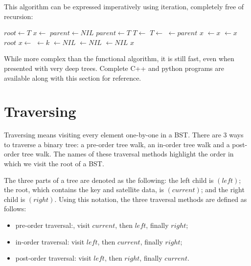 \documentclass[UTF8]{article}
\begin{document}
This algorithm can be expressed imperatively using iteration, completely free of recursion:

\begin{algorithmic}[1]
  \State $root \gets T$
  \State $x \gets$ 
  \State $parent \gets NIL$
    \State $parent \gets T$
      \State $T \gets $ 
    \Else
      \State $T \gets $ 
    \EndIf
  \EndWhile
  \State {} $\gets parent$
   
    \State \Return $x$
    \State {} $\gets x$
  \Else
    \State {} $\gets x$
  \EndIf
  \State \Return $root$
\EndFunction
\Statex
{}
  \State $x \gets $ 
  \State {} $ \gets k$
  \State {} $ \gets NIL$
  \State {} $ \gets NIL$
  \State {} $ \gets NIL$
  \State \Return $x$
\EndFunction
\end{algorithmic}

While more complex than the functional algorithm, it is still fast, even when presented with very deep trees.
Complete C++ and python programs are available along with this section for reference.

\section{Traversing}

Traversing means visiting every element one-by-one in a BST. There are 3 ways to traverse a binary tree: a
pre-order tree walk, an in-order tree walk and a post-order tree walk. The names of these traversal methods
highlight the order in which we visit the root of a BST.

The three parts of a tree are denoted as the following: the left child is $(left)$; the root, which contains
the key and satellite data, is $(current)$; and the right child is $(right)$. Using this notation, the three
traversal methods are defined as follows:

\begin{itemize}
\item pre-order traversal:, visit $current$, then $left$, finally $right$;
\item in-order traversal: visit $left$, then $current$, finally $right$;
\item post-order traversal: visit $left$, then $right$, finally $current$.
\end{itemize}
\end{document}
